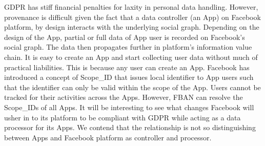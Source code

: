 \documentclass[a4paper,twoside]{article}
\begin{document}
GDPR has stiff financial penalties for laxity in personal data
handling. However, provenance is difficult given the fact that a data
controller (an App) on Facebook platform, by design interacts with the
underlying social graph. Depending on the design of the App, partial
or full data of App user is recorded on Facebook's social graph. The
data then propagates further in platform's information value chain. It
is easy to create an App and start collecting user data without much
of practical liabilities. This is because any user can create an App.
Facebook has introduced a concept of Scope\_ID that issues local
identifier to App users such that the identifier can only be valid
within the scope of the App. Users cannot be tracked for their
activities across the Apps. However, FBAN can resolve the Scope\_IDs
of all Apps. It will be interesting to see what changes Facebook will
usher in to its platform to be compliant with GDPR while acting as a
data processor for its Apps. We contend that the relationship is not
so distinguishing between Apps and Facebook platform as controller and
processor. 




\end{document}
